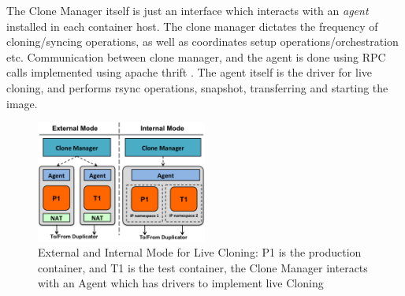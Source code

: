 The Clone Manager itself is just an interface which interacts with an \textit{agent} installed in each container host.
The clone manager dictates the frequency of cloning/syncing operations, as well as  coordinates setup operations/orchestration etc.
Communication between clone manager, and the agent is done using RPC calls implemented using apache thrift \cite{thrift}.
The agent itself is the driver for live cloning, and performs rsync operations, snapshot, transferring and starting the image.

\begin{figure}[t]
  \begin{center}
    \includegraphics[width=0.5\textwidth]{figs/ModesCloning.png}
    \caption{External and Internal Mode for Live Cloning: P1 is the production container, and T1 is the test container, the Clone Manager interacts with an Agent which has drivers to implement live Cloning}
    \label{fig:modesCloning}
  \end{center}
\end{figure}



